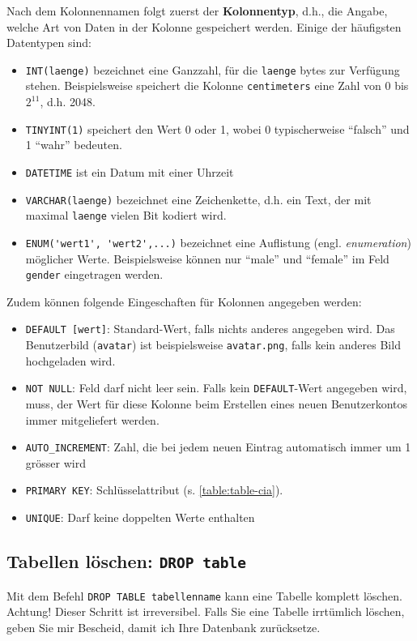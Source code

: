 Nach dem Kolonnennamen folgt zuerst der \textbf{Kolonnentyp}, d.h., die Angabe, welche Art von Daten in der Kolonne gespeichert werden. Einige der häufigsten Datentypen sind:
\begin{itemize}
\item \lstinline[style=sql]|INT(laenge)| bezeichnet eine Ganzzahl, für die \texttt{laenge} bytes zur Verfügung stehen. Beispielsweise speichert die Kolonne \texttt{centimeters} eine Zahl von 0 bis $2^{11}$, d.h. 2048.
\item \lstinline[style=sql]|TINYINT(1)| speichert den Wert 0 oder 1, wobei 0 typischerweise ``falsch'' und 1 ``wahr'' bedeuten.
\item \lstinline[style=sql]|DATETIME| ist ein Datum mit einer Uhrzeit
\item \lstinline[style=sql]|VARCHAR(laenge)| bezeichnet eine Zeichenkette, d.h. ein Text, der mit maximal \texttt{laenge} vielen Bit kodiert wird.
\item \lstinline[style=sql]|ENUM('wert1', 'wert2',...)| bezeichnet eine Auflistung (engl. \textit{enumeration}) möglicher Werte. Beispielsweise können nur ``male'' und ``female'' im Feld \texttt{gender} eingetragen werden.
\end{itemize}

Zudem können folgende Eingeschaften für Kolonnen angegeben werden:
\begin{itemize}
	\item \lstinline[style=sql]|DEFAULT [wert]|: Standard-Wert, falls nichts anderes angegeben wird. Das Benutzerbild (\texttt{avatar}) ist beispielsweise \texttt{avatar.png}, falls kein anderes Bild hochgeladen wird.
	\item \lstinline[style=sql]|NOT NULL|: Feld darf nicht leer sein. Falls kein \lstinline[style=sql]|DEFAULT|-Wert angegeben wird, muss, der Wert für diese Kolonne beim Erstellen eines neuen Benutzerkontos immer mitgeliefert werden.
	\item \lstinline[style=sql]|AUTO_INCREMENT|: Zahl, die bei jedem neuen Eintrag automatisch immer um 1 grösser wird
	\item \lstinline[style=sql]|PRIMARY KEY|: Schlüsselattribut (s. \cref{table:table-cia}).
	\item \lstinline[style=sql]|UNIQUE|: Darf keine doppelten Werte enthalten
\end{itemize}

\subsection{Tabellen löschen: \lstinline[style=sql]|DROP table|}
Mit dem Befehl \lstinline[style=sql]|DROP TABLE tabellenname| kann eine Tabelle komplett löschen. Achtung! Dieser Schritt ist irreversibel. Falls Sie eine Tabelle irrtümlich löschen, geben Sie mir Bescheid, damit ich Ihre Datenbank zurücksetze.

